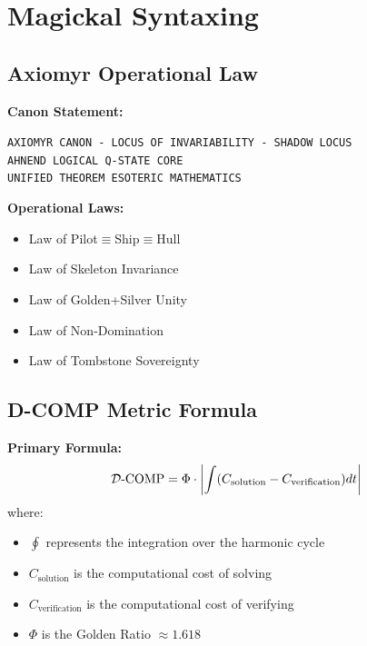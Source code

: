 \section{Magickal Syntaxing}

\subsection{Axiomyr Operational Law}

\textbf{Canon Statement:}
\begin{center}
    \texttt{AXIOMYR CANON - LOCUS OF INVARIABILITY - SHADOW LOCUS} \\
    \texttt{AHNEND LOGICAL Q-STATE CORE} \\
    \texttt{UNIFIED THEOREM ESOTERIC MATHEMATICS}
\end{center}

\textbf{Operational Laws:}
\begin{itemize}
    \item Law of Pilot$\equiv$Ship$\equiv$Hull
    \item Law of Skeleton Invariance
    \item Law of Golden+Silver Unity
    \item Law of Non-Domination
    \item Law of Tombstone Sovereignty
\end{itemize}

\subsection{D-COMP Metric Formula}

\textbf{Primary Formula:}
\begin{equation}
    \mathcal{D}\text{-}\mathrm{COMP} = \Phi \cdot \left| \int (C_{\text{solution}} - C_{\text{verification}}) dt \right|
\end{equation}
where:
\begin{itemize}
    \item $\oint$ represents the integration over the harmonic cycle
    \item $C_{\text{solution}}$ is the computational cost of solving
    \item $C_{\text{verification}}$ is the computational cost of verifying
    \item $\Phi$ is the Golden Ratio $\approx 1.618$
\end{itemize}

